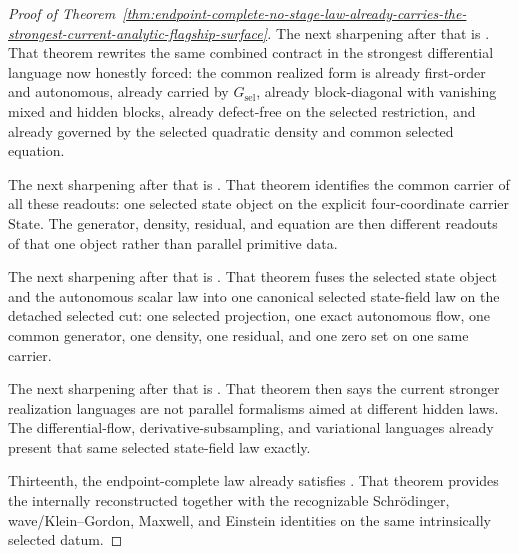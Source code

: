 \begin{proof}[Proof of Theorem~\ref{thm:endpoint-complete-no-stage-law-already-carries-the-strongest-current-analytic-flagship-surface}]
The next sharpening after that is
. That
theorem rewrites the same combined contract in the strongest differential
language now honestly forced: the common realized form is already first-order
and autonomous, already carried by \(G_{\mathrm{sel}}\), already block-diagonal
with vanishing mixed and hidden blocks, already defect-free on the selected
restriction, and already governed by the selected quadratic density and common
selected equation.

The next sharpening after that is
. That
theorem identifies the common carrier of all these readouts: one selected state
object on the explicit four-coordinate carrier \(\mathrm{State}\). The
generator, density, residual, and equation are then different readouts of that
one object rather than parallel primitive data.

The next sharpening after that is
. That
theorem fuses the selected state object and the autonomous scalar law into one
canonical selected state-field law on the detached selected cut: one selected
projection, one exact autonomous flow, one common generator, one density, one
residual, and one zero set on one same carrier.

The next sharpening after that is
.
That theorem then says the current stronger realization languages are not
parallel formalisms aimed at different hidden laws. The differential-flow,
derivative-subsampling, and variational languages already present that same
selected state-field law exactly.

Thirteenth, the endpoint-complete law already satisfies
. That theorem
provides the internally reconstructed 
together with the recognizable Schr\"odinger, wave/Klein--Gordon, Maxwell,
and Einstein identities on the same intrinsically selected datum.


\end{proof}
